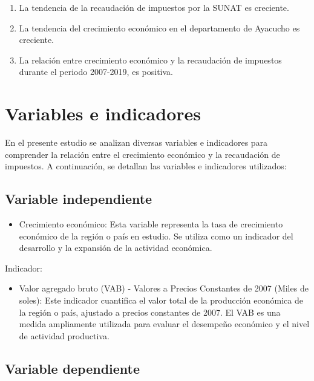 \documentclass[
  letterpaper,
]{article}
\providecommand{\tightlist}{%
  \setlength{\itemsep}{0pt}\setlength{\parskip}{0pt}}\usepackage{longtable,booktabs,array}
\begin{document}
\begin{enumerate}
\def\labelenumi{\arabic{enumi}.}
\tightlist
\item
  La tendencia de la recaudación de impuestos por la SUNAT es creciente.
\item
  La tendencia del crecimiento económico en el departamento de Ayacucho
  es creciente.
\item
  La relación entre crecimiento económico y la recaudación de impuestos
  durante el periodo 2007-2019, es positiva.
\end{enumerate}

\hypertarget{variables-e-indicadores}{%
\section{Variables e indicadores}\label{variables-e-indicadores}}

En el presente estudio se analizan diversas variables e indicadores para
comprender la relación entre el crecimiento económico y la recaudación
de impuestos. A continuación, se detallan las variables e indicadores
utilizados:

\hypertarget{variable-independiente}{%
\subsection{Variable independiente}\label{variable-independiente}}

\begin{itemize}
\tightlist
\item
  Crecimiento económico: Esta variable representa la tasa de crecimiento
  económico de la región o país en estudio. Se utiliza como un indicador
  del desarrollo y la expansión de la actividad económica.
\end{itemize}

Indicador:

\begin{itemize}
\tightlist
\item
  Valor agregado bruto (VAB) - Valores a Precios Constantes de 2007
  (Miles de soles): Este indicador cuantifica el valor total de la
  producción económica de la región o país, ajustado a precios
  constantes de 2007. El VAB es una medida ampliamente utilizada para
  evaluar el desempeño económico y el nivel de actividad productiva.
\end{itemize}

\hypertarget{variable-dependiente}{%
\subsection{Variable dependiente}\label{variable-dependiente}}
\end{document}
